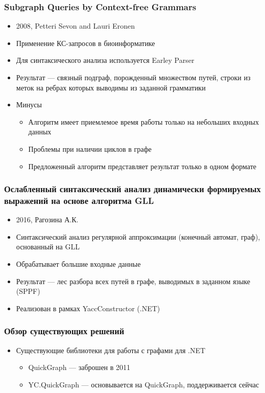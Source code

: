 \documentclass{beamer}
\begin{document}
\begin{frame}
  \transwipe[direction=90]
  \frametitle{Subgraph Queries by Context-free Grammars}
  \begin{itemize}
    \item 2008, Petteri Sevon and Lauri Eronen
    \item Применение КС-запросов в биоинформатике
    \item Для синтаксического анализа используется Earley Parser 
    \item Результат --- связный подграф, порожденный множеством путей, строки из меток на ребрах которых выводимы из заданной грамматики
  \end{itemize}
  
  \begin{itemize}
    \item Минусы
    \begin{itemize}
      \item Алгоритм имеет приемлемое время работы только на небольших входных данных
      \item Проблемы при наличии циклов в графе
      \item Предложенный алгоритм представляет результат только в одном формате
    \end{itemize}
  \end{itemize}
\end{frame}

\begin{frame}
  \transwipe[direction=90]
  \frametitle{Ослабленный синтаксический анализ динамически формируемых выражений на основе алгоритма GLL}
  \begin{itemize}
    \item 2016, Рагозина А.К.
    \item Синтаксический анализ регулярной аппроксимации (конечный автомат, граф), основанный на GLL
    \item Обрабатывает большие входные данные 
    \item Результат --- лес разбора всех путей в графе, выводимых в заданном языке (SPPF)
    \item Реализован в рамках YaccConstructor (.NET)
  \end{itemize}
\end{frame}

\begin{frame}
  \transwipe[direction=90]
  \frametitle{Обзор существующих решений}
  \begin{itemize}
    \item Существующие библиотеки для работы с графами для .NET
    \begin{itemize}
        \item QuickGraph --- заброшен в 2011
        \item YC.QuickGraph --- основывается на QuickGraph, поддерживается сейчас
    \end{itemize}
  \end{itemize}
\end{frame}
\end{document}

